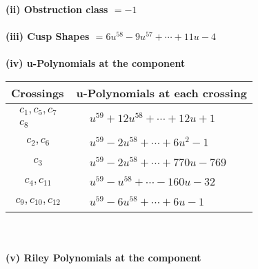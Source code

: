 \documentclass[1p]{elsarticle_modified}
\theoremstyle{definition}
\begin{document}
\flushleft \textbf{(ii) Obstruction class $= -1$}\\~\\
\flushleft \textbf{(iii) Cusp Shapes $= 6 u^{58}-9 u^{57}+\cdots+11 u-4$}\\~\\
\newpage\renewcommand{\arraystretch}{1}
\flushleft \textbf{(iv) u-Polynomials at the component}\newline \\
\begin{tabular}{m{50pt}|m{274pt}}
Crossings & \hspace{64pt}u-Polynomials at each crossing \\
\hline $$\begin{aligned}c_{1},c_{5},c_{7}\\c_{8}\end{aligned}$$&$\begin{aligned}
&u^{59}+12 u^{58}+\cdots+12 u+1
\end{aligned}$\\
\hline $$\begin{aligned}c_{2},c_{6}\end{aligned}$$&$\begin{aligned}
&u^{59}-2 u^{58}+\cdots+6 u^2-1
\end{aligned}$\\
\hline $$\begin{aligned}c_{3}\end{aligned}$$&$\begin{aligned}
&u^{59}-2 u^{58}+\cdots+770 u-769
\end{aligned}$\\
\hline $$\begin{aligned}c_{4},c_{11}\end{aligned}$$&$\begin{aligned}
&u^{59}- u^{58}+\cdots-160 u-32
\end{aligned}$\\
\hline $$\begin{aligned}c_{9},c_{10},c_{12}\end{aligned}$$&$\begin{aligned}
&u^{59}-6 u^{58}+\cdots+6 u-1
\end{aligned}$\\
\hline
\end{tabular}\\~\\
\newpage\renewcommand{\arraystretch}{1}
\flushleft \textbf{(v) Riley Polynomials at the component}\newline \\
\end{document}
